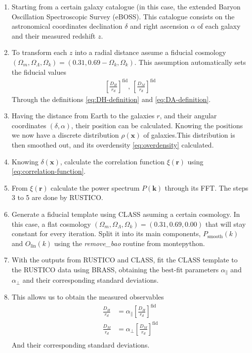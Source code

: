\begin{enumerate}
	\item Starting from a certain galaxy catalogue (in this case, the extended Baryon Oscillation Spectroscopic Survey (eBOSS). This catalogue consists on the astronomical coordinates declination $\delta$ and right ascension $\alpha$ of each galaxy and their measured redshift $z$.
	\item To transform each $z$ into a radial distance assume a fiducial cosmology $(\Omega_m, \Omega_\Lambda, \Omega_k) = (0.31, 0.69-\Omega_k, \Omega_k) $. This assumption automatically sets the fiducial values 
	\begin{align}
		\left[ \frac{D_H}{r_d} \right] ^\text{fid}, \,\left[ \frac{D_M}{r_d} \right] ^\text{fid}
	\end{align}
	Through the definitions \eqref{eq:DH-definition} and \eqref{eq:DA-definition}.
\item Having the distance from Earth to the galaxies $r$, and their angular coordinates $(\delta, \alpha)$, their position can be calculated. Knowing the positions we now have a discrete distribution $\rho(\textbf{x})$ of galaxies.This distribution is then smoothed out, and its overdensity \eqref{eq:overdensity} calculated.
\item Knowing $\delta(\textbf{x})$, calculate the correlation function $\xi(\textbf{r})$ using \eqref{eq:correlation-function}.
\item From $\xi(\textbf{r})$ calculate the power spectrum $P(\textbf{k})$ through its FFT. The steps 3 to 5 are done by RUSTICO.
\item Generate a fiducial template using CLASS asuming a certain cosmology. In this case, a flat cosmology $(\Omega_m, \Omega_\Lambda, \Omega_k) = (0.31, 0.69, 0.00)$ that will stay constant for every iteration. Split it into its main components,  $P_{\text{smooth}}(k)$ and $O_{\text{lin}}(k)$ using the \textit{remove\_bao} routine from montepython.
\item With the outputs from RUSTICO and CLASS, fit the CLASS template to the RUSTICO data using BRASS, obtaining the best-fit parameters $\alpha_\parallel$ and $\alpha_\perp$ and their corresponding standard deviations.
\item This allows us to obtain the measured observables 
\begin{align}
	\frac{D_H}{r_d} &= \alpha_\parallel \left[ \frac{D_H}{r_d} \right]^\text{fid} \\
	\frac{D_M}{r_d} &= \alpha_\perp \left[ \frac{D_M}{r_d} \right]^\text{fid} \\
\end{align}
And their corresponding standard deviations.

\end{enumerate}



